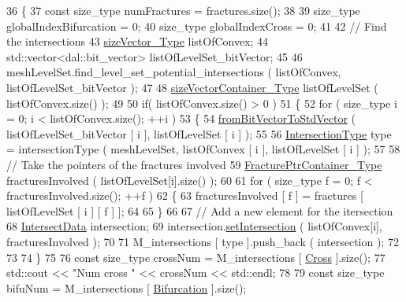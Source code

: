 \begin{DoxyCode}
36 \{
37     \textcolor{keyword}{const} size\_type numFractures = fractures.size();
38 
39     size\_type globalIndexBifurcation = 0;
40     size\_type globalIndexCross = 0;
41 
42     \textcolor{comment}{// Find the intersections}
43     \hyperlink{Core_8h_a83c51913d041a5001e8683434c09857f}{sizeVector\_Type} listOfConvex;
44     std::vector<dal::bit\_vector> listOfLevelSet\_bitVector;
45 
46     meshLevelSet.find\_level\_set\_potential\_intersections ( listOfConvex, listOfLevelSet\_bitVector );
47 
48     \hyperlink{Core_8h_a80e8381d86ecb0a7f4f87ff84d1a0be5}{sizeVectorContainer\_Type} listOfLevelSet ( listOfConvex.size() );
49 
50     \textcolor{keywordflow}{if}( listOfConvex.size() > 0 )
51     \{
52         \textcolor{keywordflow}{for} ( size\_type i = 0; i < listOfConvex.size(); ++i )
53         \{
54             \hyperlink{UsefulFunctions_8h_a0ea0b08a12a1e6a94718cf3bcd60edeb}{fromBitVectorToStdVector} ( listOfLevelSet\_bitVector [ i ], 
      listOfLevelSet [ i ] );
55 
56             \hyperlink{classFractureIntersect_a9a4e4a784fa4c8e359767ed543f89dc5}{IntersectionType} type = intersectionType ( meshLevelSet, listOfConvex [ i ], 
      listOfLevelSet [ i ] );
57             
58             \textcolor{comment}{// Take the pointers of the fractures involved}
59             \hyperlink{FractureHandler_8h_a2f0b57e18ecf89912d7de0c87158009e}{FracturePtrContainer\_Type} fracturesInvolved ( listOfLevelSet[i].size()
       );
60 
61             \textcolor{keywordflow}{for} ( size\_type f = 0; f < fracturesInvolved.size(); ++f )
62             \{
63                  fracturesInvolved [ f ] = fractures [ listOfLevelSet [ i ] [ f ] ];
64 
65             \}
66 
67             \textcolor{comment}{// Add a new element for the itersection}
68             \hyperlink{classIntersectData}{IntersectData} intersection;
69             intersection.\hyperlink{classIntersectData_a306be572e6e9a2359310ba908e693b2e}{setIntersection} ( listOfConvex[i], fracturesInvolved );
70 
71             M\_intersections [ type ].push\_back ( intersection );
72 
73 
74         \}
75 
76         \textcolor{keyword}{const} size\_type crossNum = M\_intersections [ \hyperlink{classFractureIntersect_a9a4e4a784fa4c8e359767ed543f89dc5a743fef1af81c0e61412fafb9438b380e}{Cross} ].size();
77         std::cout << \textcolor{stringliteral}{"Num cross "} << crossNum << std::endl;
78 
79         \textcolor{keyword}{const} size\_type bifuNum = M\_intersections [ \hyperlink{classFractureIntersect_a9a4e4a784fa4c8e359767ed543f89dc5a4d466b3d3de0af7e18732b6f765bb1af}{Bifurcation} ].size();

\end{DoxyCode}
